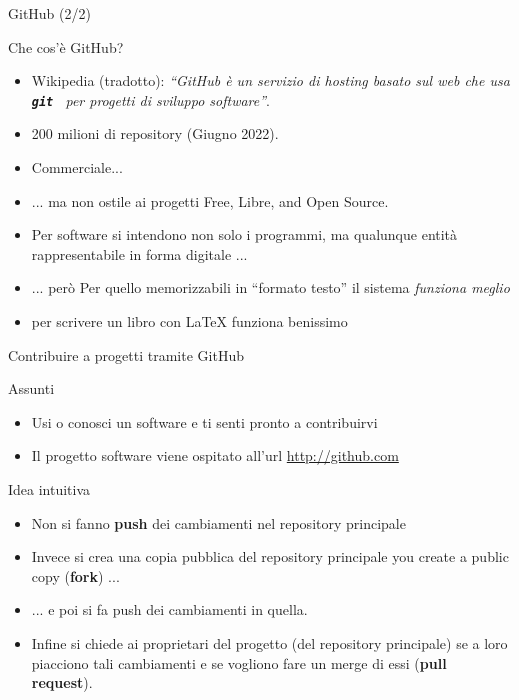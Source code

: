 \documentclass{beamer}
\newcommand{\git}{\texttt{\textbf{git}}\xspace}
\begin{document}
\begin{frame}{\centerline{GitHub (2/2)}}
  \begin{block}{Che cos'\`{e} GitHub?}
    \begin{itemize}
    \item Wikipedia (tradotto): \emph{``GitHub \`{e} un servizio di hosting basato sul web che usa \git~ per progetti di sviluppo software''}.
    \item 200 milioni di repository (Giugno 2022).
    \item Commerciale...
    \item ... ma non ostile ai progetti Free, Libre, and Open Source.
    \item Per software si intendono non solo i programmi, ma qualunque entit\`{a} rappresentabile in forma digitale ...
    \item ... per\`{o} Per quello memorizzabili in ``formato testo'' il sistema \textit{funziona meglio}
    \item per scrivere un libro con LaTeX funziona benissimo
    \end{itemize}
  \end{block}
\end{frame}


\begin{frame}{\centerline{Contribuire a progetti tramite GitHub}}
  \begin{block}{Assunti}
    \begin{itemize}
    \item Usi o conosci un software e ti senti pronto a contribuirvi
    \item Il progetto software viene ospitato all'url \url{http://github.com}
    \end{itemize}
  \end{block}
  \begin{block}{Idea intuitiva}
    \begin{itemize}
    \item Non si fanno \textbf{ push} dei cambiamenti nel repository principale
    \item Invece si crea una copia pubblica del repository principale you create a public copy (\textbf{fork}) ...
    \item ... e poi si fa push dei cambiamenti in quella.
    \item Infine si chiede ai proprietari del progetto (del repository principale) se a loro piacciono tali cambiamenti e se vogliono fare un merge di essi (\textbf{pull request}).
    \end{itemize}
  \end{block}
\end{frame}
\end{document}

